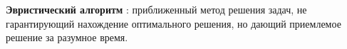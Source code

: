 \textbf{Эвристический алгоритм} : приближенный метод решения задач, не гарантирующий нахождение оптимального решения, но дающий приемлемое решение за разумное время.
